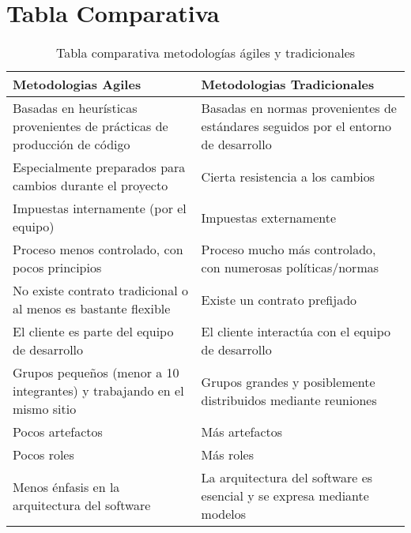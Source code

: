 \documentclass[10pt,a4paper]{article}
\begin{document}
\section{Tabla Comparativa}
\begin{table}[h!]
\centering
\begin{tabular} {|p{6cm}|p{6cm}|} \hline
Metodologias Agiles & Metodologias Tradicionales \\\hline
Basadas en heur\'isticas provenientes de pr\'acticas de
producci\'on de c\'odigo & Basadas en normas provenientes de est\'andares
seguidos por el entorno de desarrollo\par \\\hline
Especialmente preparados para cambios durante el 
proyecto & Cierta resistencia a los cambios\\\hline
Impuestas internamente (por el equipo) & Impuestas externamente\\\hline
Proceso menos controlado, con pocos principios & Proceso mucho m\'as controlado, con numerosas
pol\'iticas/normas\\\hline
No existe contrato tradicional o al menos es bastante flexible & Existe un contrato prefijado\\\hline
El cliente es parte del equipo de desarrollo & El cliente interact\'ua con el equipo de desarrollo\\\hline
Grupos peque\~nos (menor a 10 integrantes) y trabajando en el mismo sitio & Grupos grandes y posiblemente distribuidos mediante reuniones\\\hline
Pocos artefactos & M\'as artefactos\\\hline
Pocos roles & M\'as roles\\\hline
Menos \'enfasis en la arquitectura del software & La arquitectura del software es esencial y se expresa mediante modelos\\\hline


\end{tabular}
\caption{Tabla comparativa metodolog\'ias \'agiles y tradicionales}
\end{table}
\end{document}
